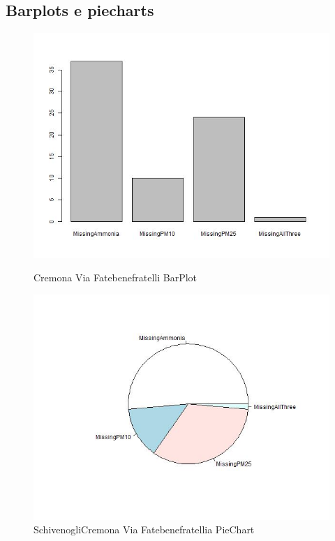 \documentclass{article}
\begin{document}
\subsection{Barplots e piecharts}
\begin{figure}[H]
  \centering 
  \includegraphics[scale = 0.4]{Picture/Barplots e piecharts/Cremona Via Fatebenefratelli BarPlotMV.jpeg}
  \caption{Cremona Via Fatebenefratelli BarPlot}
  \centering
  \centering 
  \includegraphics[scale = 0.4]{Picture/Barplots e piecharts/Cremona Via Fatebenefratelli PieChartMV.jpeg}
  \caption{SchivenogliCremona Via Fatebenefratellia PieChart}
  \centering
\end{figure}
\end{document}
